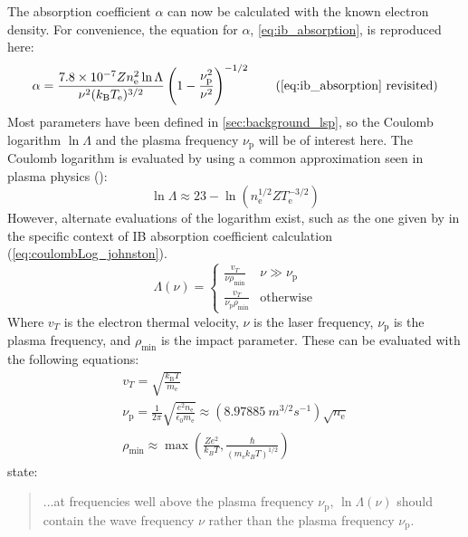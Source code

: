         The absorption coefficient $\alpha$ can now be calculated with the known electron density. For convenience, the equation for $\alpha$, \autoref{eq:ib_absorption}, is reproduced here:
        \begin{equation*}
            \ibalphaeq \tag{\ref{eq:ib_absorption} revisited}
        \end{equation*}
        Most parameters have been defined in \autoref{sec:background_lsp}, so the Coulomb logarithm $\ln{\Lambda}$ and the plasma frequency $\nu_\mathrm{p}$ will be of interest here. The Coulomb logarithm is evaluated by \textcite{nassarInvestigationLasersustainedPlasma2012} using a common approximation seen in plasma physics (\textcite{richardson2019NRLPlasma2019}):
        \begin{equation}\label{eq:coulombLog_NRL}
            \ln{\Lambda} \approx 23-\ln{(n_\mathrm{e}^{1/2}ZT_\mathrm{e}^{-3/2})}
        \end{equation}
        However, alternate evaluations of the logarithm exist, such as the one given by \textcite{johnstonCorrectValuesHighfrequency1973} in the specific context of IB absorption coefficient calculation (\autoref{eq:coulombLog_johnston}). 
        \begin{equation} \label{eq:coulombLog_johnston}
            \Lambda(\nu) = \begin{cases}
                \frac{v_T}{\nu\rho_\mathrm{min}} & \nu \gg \nu_\mathrm{p}\\
                \frac{v_T}{\nu_\mathrm{p}\rho_\mathrm{min}} & \text{otherwise}
            \end{cases}
        \end{equation}
        Where $v_T$ is the electron thermal velocity, $\nu$ is the laser frequency, $\nu_\mathrm{p}$ is the plasma frequency, and $\rho_\mathrm{min}$ is the impact parameter. These can be evaluated with the following equations:
        \begin{gather}
            v_T = \sqrt{\frac{k_\mathrm{B}T}{m_\mathrm{e}}} \\
            \nu_\mathrm{p} = \frac{1}{2\pi}\sqrt{\frac{e^2n_\mathrm{e}}{\epsilon_0 m_\mathrm{e}}} \approx (\qty{8.97885}{m^{3/2}s^{-1}})\sqrt{n_\mathrm{e}}\\
            \rho_\mathrm{min} \approx \max{\left(\frac{Ze^2}{k_BT}, \frac{\hbar}{(m_\mathrm{e}k_BT)^{1/2}}\right)}
        \end{gather}
        \textcite{johnstonCorrectValuesHighfrequency1973} state:
        \begin{quote}
            ...at frequencies well above the plasma frequency $\nu_\mathrm{p}$, $\ln{\Lambda}(\nu)$ should contain the wave frequency $\nu$ rather than the plasma frequency $\nu_\mathrm{p}$.
        \end{quote}
